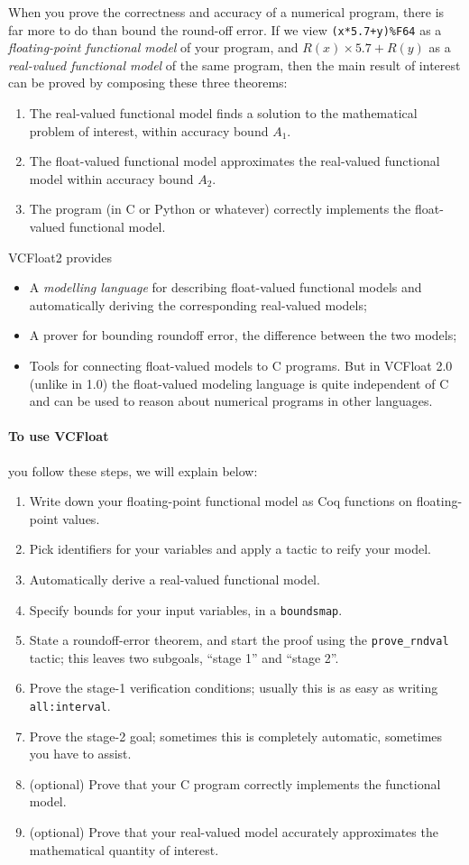 \documentclass[article]{memoir}
\begin{document}
When you prove the correctness and accuracy of a numerical program,
there is far more to do than bound the round-off error.
If we view \lstinline{(x*5.7+y)%F64} as a \emph{floating-point functional model}
  of your program, and $R(x)\times 5.7+R(y)$ as a
  \emph{real-valued functional model} of the same program, then
  the main result of interest can be proved by composing
  these three theorems:
\begin{enumerate}
  \item The real-valued functional model finds a solution to
    the mathematical problem of interest, within accuracy bound $A_1$.
  \item The float-valued functional model approximates the
    real-valued functional model within accuracy bound $A_2$.
  \item The program (in C or Python or whatever) correctly implements
    the float-valued functional model.
\end{enumerate}
VCFloat2 provides
\begin{itemize}
\item A \emph{modelling language} for describing float-valued functional
  models and automatically deriving the corresponding real-valued models;
\item A prover for bounding roundoff error, the difference between the two models;
\item Tools for connecting float-valued models to C programs.  But
  in VCFloat 2.0 (unlike in 1.0) the float-valued modeling language
  is quite independent of C and can be used to reason about numerical
  programs in other languages.
\end{itemize}

\paragraph{To use VCFloat} you follow these steps, we will explain below:
\begin{enumerate}
\item Write down your floating-point functional model as Coq functions on floating-point values.
\item Pick identifiers for your variables and apply a tactic to reify your model.
\item Automatically derive a real-valued functional model.
\item Specify bounds for your input variables, in a \lstinline{boundsmap}.
\item State a roundoff-error theorem, and start the proof using the
  \lstinline{prove_rndval} tactic; this leaves two subgoals, ``stage 1'' and ``stage 2''.
\item Prove the stage-1 verification conditions; usually this is as easy as
  writing \lstinline{all:interval}.
\item Prove the stage-2 goal; sometimes this is completely automatic, sometimes you have to assist.
\item (optional) Prove that your C program correctly implements the functional model.
\item (optional) Prove that your real-valued model accurately approximates the
  mathematical quantity of interest.
\end{enumerate}
\end{document}
